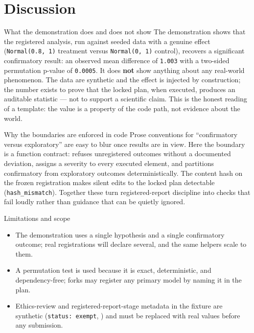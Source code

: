 \documentclass[
  ignorenonframetext,
]{beamer}
\author{\texorpdfstring{}{}}
\date{}
\providecommand{\tightlist}{%
  \setlength{\itemsep}{0pt}\setlength{\parskip}{0pt}}
\begin{document}
\section{Discussion}\label{sec:discussion}

\begin{frame}{What the demonstration does and
does not show}
\protect{}\label{what-the-demonstration-does-and-does-not-show}
The demonstration shows that the registered analysis, run against seeded
data with a genuine effect (\texttt{Normal(0.8,\ 1)} treatment versus
\texttt{Normal(0,\ 1)} control), recovers a significant confirmatory
result: an observed mean difference of \texttt{1.003} with a two-sided
permutation p-value of \texttt{0.0005}. It does \textbf{not} show
anything about any real-world phenomenon. The data are synthetic and the
effect is injected by construction; the number exists to prove that the
locked plan, when executed, produces an auditable statistic --- not to
support a scientific claim. This is the honest reading of a template:
the value is a property of the code path, not evidence about the world.
\end{frame}

\begin{frame}{Why the boundaries are enforced
in code}
\protect{}\label{why-the-boundaries-are-enforced-in-code}
Prose conventions for ``confirmatory versus exploratory'' are easy to
blur once results are in view. Here the boundary is a function contract:
 refuses unregistered
outcomes without a documented deviation,
 assigns a severity to every executed
element, and  partitions confirmatory from
exploratory outcomes deterministically. The content hash on the frozen
registration makes silent edits to the locked plan detectable
(\texttt{hash\_mismatch}). Together these turn registered-report
discipline into checks that fail loudly rather than guidance that can be
quietly ignored.
\end{frame}

\begin{frame}{Limitations and scope}
\protect{}\label{limitations-and-scope}
\begin{itemize}
\tightlist
\item
  The demonstration uses a single hypothesis and a single confirmatory
  outcome; real registrations will declare several, and the same helpers
  scale to them.
\item
  A permutation test is used because it is exact, deterministic, and
  dependency-free; forks may register any primary model by naming it in
  the plan.
\item
  Ethics-review and registered-report-stage metadata in the fixture are
  synthetic (\texttt{status:\ exempt},
  ) and must be replaced
  with real values before any submission.
\end{itemize}
\end{frame}
\end{document}
